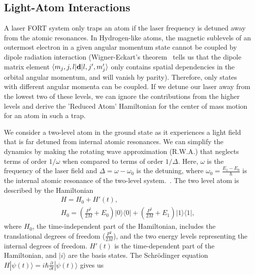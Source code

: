\subsection{Light-Atom Interactions}
\label{chapter-intro:section:lightatom:subsec:2lvl}
A laser FORT system only traps an atom if the laser frequency is detuned away from the atomic resonances. In Hydrogen-like atoms, the magnetic sublevels of an outermost electron in a given angular momentum state cannot be coupled by dipole radiation interaction (Wigner-Eckart's theorem~\cite{sakurai} tells us that the dipole matrix element $\langle m_j, j,l|{\bf d}|l,j',m'_j\rangle$ only contains spatial dependencies in the orbital angular momentum, and will vanish by parity). Therefore, only states with different angular momenta can be coupled. If we detune our laser away from the lowest two of these levels, we can ignore the contributions from the higher levels and derive the 'Reduced Atom' Hamiltonian for the center of mass motion for an atom in such a trap.

We consider a two-level atom in the ground state as it experiences a light field that is far detuned from internal atomic resonances. We can simplify the dynamics by making the rotating wave approximation (R.W.A.) that neglects terms of order $1/\omega$ when compared to terms of order $1/\Delta$. Here, $\omega$ is the frequency of the laser field and $\Delta=\omega-\omega_0$ is the detuning, where $\omega_0=\frac{E_1-E_0}{\hbar}$ is the internal atomic resonance of the two-level system.~\cite{metcalf:vanderstraten}. The two level atom is described by the Hamiltonian
\begin{eqnarray}
 H=H_0+H'(t),\nonumber \\
 H_0= \left(\frac{P^2}{2M} + E_0 \right) | 0 \rangle \langle 0 | + \left( \frac{P^2}{2M} + E_1 \right) |1 \rangle \langle 1|,
\label{eq:2lvl:hamilt:chapter-intro}
\end{eqnarray}
where $H_0$, the time-independent part of the Hamiltonian, includes the translational degrees of freedom ($\frac{P^2}{2M}$), and the two energy levels representing the internal degrees of freedom. $H'(t)$ is the time-dependent part of the Hamiltonian, and $|i\rangle$ are the basis states. The Schr\"odinger equation $H|\psi(t)\rangle=i\hbar\frac{\partial}{\partial t}|\psi(t)\rangle$ gives us 

